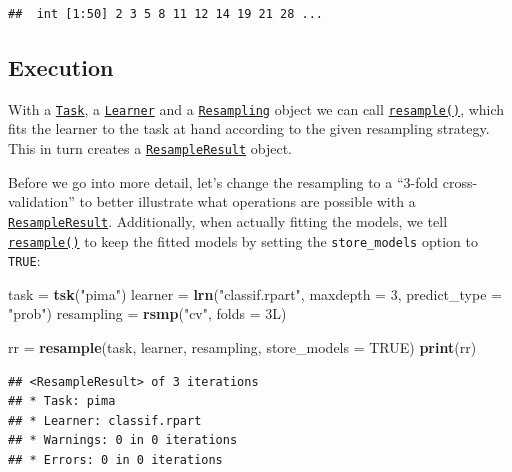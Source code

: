 \documentclass[]{scrbook}
\newenvironment{Shaded}{\begin{snugshade}}{\end{snugshade}}
\newcommand{\DataTypeTok}[1]{\textcolor[rgb]{0.13,0.29,0.53}{#1}}
\newcommand{\DecValTok}[1]{\textcolor[rgb]{0.00,0.00,0.81}{#1}}
\newcommand{\KeywordTok}[1]{\textcolor[rgb]{0.13,0.29,0.53}{\textbf{#1}}}
\newcommand{\NormalTok}[1]{#1}
\newcommand{\OtherTok}[1]{\textcolor[rgb]{0.56,0.35,0.01}{#1}}
\newcommand{\StringTok}[1]{\textcolor[rgb]{0.31,0.60,0.02}{#1}}
\renewenvironment{Shaded} {\begin{snugshade}\small} {\end{snugshade}}
\begin{document}
\begin{verbatim}
##  int [1:50] 2 3 5 8 11 12 14 19 21 28 ...
\end{verbatim}

\hypertarget{resampling-exec}{%
\subsection{Execution}\label{resampling-exec}}

With a \href{https://mlr3.mlr-org.com/reference/Task.html}{\texttt{Task}}, a \href{https://mlr3.mlr-org.com/reference/Learner.html}{\texttt{Learner}} and a \href{https://mlr3.mlr-org.com/reference/Resampling.html}{\texttt{Resampling}} object we can call \href{https://mlr3.mlr-org.com/reference/resample.html}{\texttt{resample()}}, which fits the learner to the task at hand according to the given resampling strategy.
This in turn creates a \href{https://mlr3.mlr-org.com/reference/ResampleResult.html}{\texttt{ResampleResult}} object.

Before we go into more detail, let's change the resampling to a ``3-fold cross-validation'' to better illustrate what operations are possible with a \href{https://mlr3.mlr-org.com/reference/ResampleResult.html}{\texttt{ResampleResult}}.
Additionally, when actually fitting the models, we tell \href{https://mlr3.mlr-org.com/reference/resample.html}{\texttt{resample()}} to keep the fitted models by setting the \texttt{store\_models} option to \texttt{TRUE}:

\begin{Shaded}
\begin{Highlighting}[]
\NormalTok{task =}\StringTok{ }\KeywordTok{tsk}\NormalTok{(}\StringTok{"pima"}\NormalTok{)}
\NormalTok{learner =}\StringTok{ }\KeywordTok{lrn}\NormalTok{(}\StringTok{"classif.rpart"}\NormalTok{, }\DataTypeTok{maxdepth =} \DecValTok{3}\NormalTok{, }\DataTypeTok{predict_type =} \StringTok{"prob"}\NormalTok{)}
\NormalTok{resampling =}\StringTok{ }\KeywordTok{rsmp}\NormalTok{(}\StringTok{"cv"}\NormalTok{, }\DataTypeTok{folds =}\NormalTok{ 3L)}

\NormalTok{rr =}\StringTok{ }\KeywordTok{resample}\NormalTok{(task, learner, resampling, }\DataTypeTok{store_models =} \OtherTok{TRUE}\NormalTok{)}
\KeywordTok{print}\NormalTok{(rr)}
\end{Highlighting}
\end{Shaded}

\begin{verbatim}
## <ResampleResult> of 3 iterations
## * Task: pima
## * Learner: classif.rpart
## * Warnings: 0 in 0 iterations
## * Errors: 0 in 0 iterations
\end{verbatim}
\end{document}
